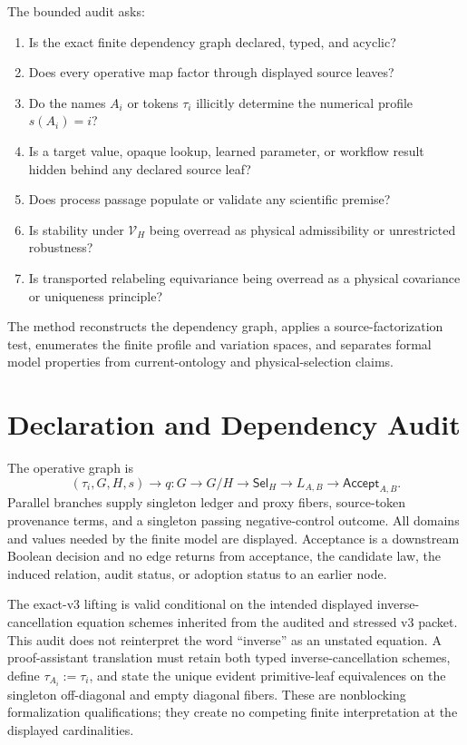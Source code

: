 \documentclass[11pt]{article}
\newcommand{\Sel}{\mathsf{Sel}_{H}}
\newcommand{\Vary}{\mathcal V_H}
\begin{document}
The bounded audit asks:
\begin{enumerate}[leftmargin=*]
  \item Is the exact finite dependency graph declared, typed, and acyclic?
  \item Does every operative map factor through displayed source leaves?
  \item Do the names \(A_i\) or tokens \(\tau_i\) illicitly determine the
  numerical profile \(s(A_i)=i\)?
  \item Is a target value, opaque lookup, learned parameter, or workflow
  result hidden behind any declared source leaf?
  \item Does process passage populate or validate any scientific premise?
  \item Is stability under \(\Vary\) being overread as physical admissibility
  or unrestricted robustness?
  \item Is transported relabeling equivariance being overread as a physical
  covariance or uniqueness principle?
\end{enumerate}

The method reconstructs the dependency graph, applies a source-factorization
test, enumerates the finite profile and variation spaces, and separates formal
model properties from current-ontology and physical-selection claims.

\section{Declaration and Dependency Audit}

The operative graph is
\[
 (\tau_i,G,H,s)\longrightarrow q:G\to G/H
 \longrightarrow \Sel
 \longrightarrow L_{A,B}
 \longrightarrow \mathsf{Accept}_{A,B}.
\]
Parallel branches supply singleton ledger and proxy fibers, source-token
provenance terms, and a singleton passing negative-control outcome.  All
domains and values needed by the finite model are displayed.  Acceptance is a
downstream Boolean decision and no edge returns from acceptance, the candidate
law, the induced relation, audit status, or adoption status to an earlier
node.

The exact-v3 lifting is valid conditional on the intended displayed
inverse-cancellation equation schemes inherited from the audited and stressed
v3 packet.  This audit does not reinterpret the word ``inverse'' as an
unstated equation.  A proof-assistant translation must retain both typed
inverse-cancellation schemes, define \(\tau_{A_i}:=\tau_i\), and state the
unique evident primitive-leaf equivalences on the singleton off-diagonal and
empty diagonal fibers.  These are nonblocking formalization qualifications;
they create no competing finite interpretation at the displayed
cardinalities.
\end{document}
